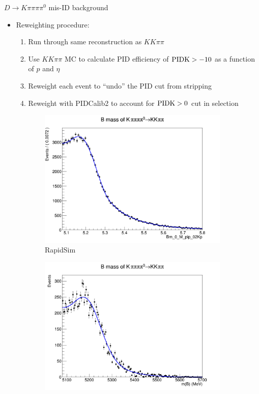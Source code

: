 \documentclass{beamer}
\begin{document}
\begin{frame}{$D\to K\pi\pi\pi\pi^0$ mis-ID background}
  \begin{itemize}
    \setlength\itemsep{0.5em}
    \item{Reweighting procedure:}
    \begin{enumerate}
      \item{Run through same reconstruction as $KK\pi\pi$}
      \item{Use $KK\pi\pi$ MC to calculate PID efficiency of $\rm{PIDK} > -10$ as a function of $p$ and $\eta$}
      \item{Reweight each event to ``undo'' the PID cut from stripping}
      \item{Reweight with PIDCalib2 to account for $\rm{PIDK} > 0$ cut in selection}
    \end{enumerate}
  \end{itemize}
  \begin{figure}
    \centering
    \begin{subfigure}{0.50\textwidth}
      \includegraphics[width = 1.0\textwidth]{Plots/Kpipipipi0BMassB2DpiD2Kpipipi_RapidSim.png}
      \caption{RapidSim}
    \end{subfigure}%
    \begin{subfigure}{0.50\textwidth}
      \includegraphics[width = 1.0\textwidth]{Plots/Kpipipipi0BMassB2DpiD2Kpipipi.png}

\end{subfigure}
\end{figure}
\end{frame}
\end{document}
